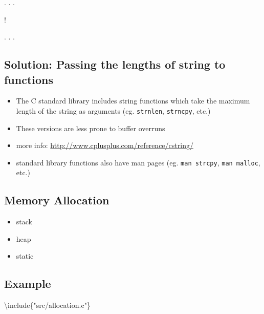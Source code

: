 \documentclass[
]{article}
\newenvironment{Shaded}{}{}
\newcommand{\NormalTok}[1]{#1}
\newcommand{\StringTok}[1]{\textcolor[rgb]{0.25,0.44,0.63}{#1}}
\providecommand{\tightlist}{%
  \setlength{\itemsep}{0pt}\setlength{\parskip}{0pt}}
\begin{document}
. . .

!

. . .


\hypertarget{solution-passing-the-lengths-of-string-to-functions}{%
\subsection{Solution: Passing the lengths of string to
functions}\label{solution-passing-the-lengths-of-string-to-functions}}

\begin{itemize}
\tightlist
\item
  The C standard library includes string functions which take the
  maximum length of the string as arguments (eg. \texttt{strnlen},
  \texttt{strncpy}, etc.)
\item
  These versions are less prone to buffer overruns
\item
  more info: \url{http://www.cplusplus.com/reference/cstring/}
\item
  standard library functions also have man pages (eg.
  \texttt{man\ strcpy}, \texttt{man\ malloc}, etc.)
\end{itemize}

\hypertarget{memory-allocation}{%
\subsection{Memory Allocation}\label{memory-allocation}}


\begin{itemize}
\tightlist
\item
  stack
\item
  heap
\item
  static
\end{itemize}

\hypertarget{example}{%
\subsection{Example}\label{example}}

\begin{Shaded}
\begin{Highlighting}[numbers=left,,]
\NormalTok{\textbackslash{}include\{}\StringTok{"src/allocation.c"}\NormalTok{\}}
\end{Highlighting}
\end{Shaded}
\end{document}
